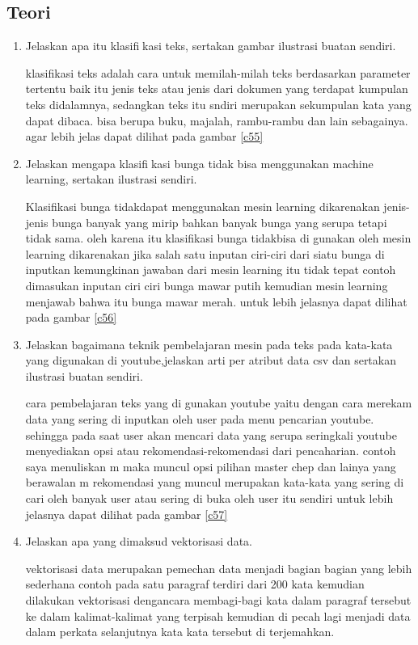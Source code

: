 \subsection{Teori}
\begin{enumerate}
\item Jelaskan apa itu klasifikasi teks, sertakan gambar ilustrasi buatan sendiri.\par
klasifikasi teks adalah cara untuk memilah-milah teks berdasarkan parameter tertentu baik itu jenis teks atau jenis dari dokumen yang terdapat kumpulan teks didalamnya, sedangkan teks itu sndiri merupakan sekumpulan kata yang dapat dibaca. bisa berupa buku, majalah, rambu-rambu dan lain sebagainya. agar lebih jelas dapat dilihat pada gambar \ref{c55}

\item Jelaskan mengapa klasifikasi bunga tidak bisa menggunakan machine learning, sertakan ilustrasi sendiri.\par
Klasifikasi bunga tidakdapat menggunakan mesin learning dikarenakan jenis-jenis bunga banyak yang mirip bahkan banyak bunga yang serupa tetapi tidak sama. oleh karena itu klasifikasi bunga tidakbisa di gunakan oleh mesin learning dikarenakan jika salah satu inputan ciri-ciri dari siatu bunga di inputkan kemungkinan jawaban dari mesin learning itu tidak tepat contoh dimasukan inputan ciri ciri bunga mawar putih kemudian mesin learning menjawab bahwa itu bunga mawar merah. untuk lebih jelasnya dapat dilihat pada gambar \ref{c56}

\item Jelaskan bagaimana teknik pembelajaran mesin pada teks pada kata-kata yang digunakan di youtube,jelaskan arti per atribut data csv dan sertakan ilustrasi buatan sendiri.\par
cara pembelajaran teks yang di gunakan youtube yaitu dengan cara merekam data yang sering di inputkan oleh user pada menu pencarian youtube. sehingga pada saat user akan mencari data yang serupa seringkali youtube menyediakan opsi atau rekomendasi-rekomendasi dari pencaharian. contoh saya menuliskan m maka muncul opsi pilihan master chep dan lainya yang berawalan m rekomendasi yang muncul merupakan kata-kata yang sering di cari oleh banyak user atau sering di buka oleh user itu sendiri untuk lebih jelasnya dapat dilihat pada gambar \ref{c57}

\item Jelaskan apa yang dimaksud vektorisasi data.\par
vektorisasi data merupakan pemechan data menjadi bagian bagian yang lebih sederhana contoh pada satu paragraf terdiri dari 200 kata kemudian dilakukan vektorisasi dengancara membagi-bagi kata dalam paragraf tersebut ke dalam kalimat-kalimat yang terpisah kemudian di pecah lagi menjadi data dalam perkata selanjutnya kata kata tersebut di terjemahkan.


\end{enumerate}
